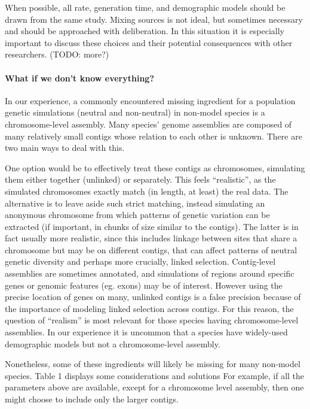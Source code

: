 \documentclass[hidelinks]{article}
\begin{document}
When possible, all rate, generation time, and demographic models should
be drawn from the same study. Mixing sources is not ideal, but sometimes
necessary and should be approached with deliberation. In this situation
it is especially important to discuss these choices and their potential
consequences with other researchers. (TODO: more?)

\hypertarget{what-if-we-dont-know-everything}{%
\paragraph{What if we don't know
everything?}\label{what-if-we-dont-know-everything}}

In our experience, a commonly encountered missing ingredient for a
population genetic simulations (neutral and non-neutral) in non-model
species is a chromosome-level assembly. Many species' genome assemblies
are composed of many relatively small contigs whose relation to each
other is unknown. There are two main ways to deal with this.

One option would be to effectively treat these contigs as chromosomes,
simulating them either together (unlinked) or separately. This feels
``realistic'', as the simulated chromosomes exactly match (in length, at
least) the real data. The alternative is to leave aside such strict
matching, instead simulating an anonymous chromosome from which patterns
of genetic variation can be extracted (if important, in chunks of size
similar to the contigs). The latter is in fact usually more realistic,
since this includes linkage between sites that share a chromosome but
may be on different contigs, that can affect patterns of neutral genetic
diversity and perhaps more crucially, linked selection. Contig-level
assemblies are sometimes annotated, and simulations of regions around
specific genes or genomic features (eg. exons) may be of interest.
However using the precise location of genes on many, unlinked contigs is
a false precision because of the importance of modeling linked selection
across contigs. For this reason, the question of ``realism'' is most
relevant for those species having chromosome-level assemblies. In our
experience it is uncommon that a species have widely-used demographic
models but not a chromosome-level assembly.

Nonetheless, some of these ingredients will likely be missing for many
non-model species. Table 1 displays some considerations and solutions
For example, if all the parameters above are available, except for a
chromosome level assembly, then one might choose to include only the
larger contigs.
\end{document}

